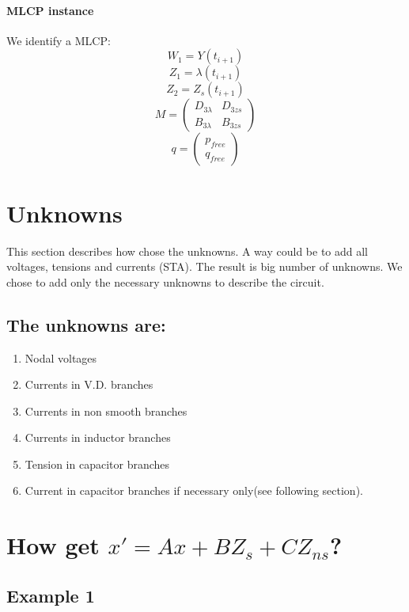 \paragraph{MLCP instance}
We identify a MLCP:\\
\[W_{1} = Y(t_{i+1})\]
\[Z_{1} = \lambda(t_{i+1})\]
\[Z_{2} = Z_{s}(t_{i+1})\]
\[M = \left(\begin{array}{cc}
  D_{3\lambda}&D_{3zs}\\
B_{3\lambda}&B_{3zs}
\end{array}\right)\]
\[q=\left(\begin{array}{c}
p_{free}\\
q_{free}\end{array}\right)\]

\section{Unknowns}
This section describes how chose the unknowns. A way could be to add all voltages, tensions and
currents (STA). The result is big number of unknowns. We chose to add only the necessary unknowns to
describe the circuit.

\subsection{The unknowns are:\\}
\begin{enumerate}
\item Nodal voltages\\
\item Currents in V.D. branches\\
\item Currents in non smooth branches\\
\item Currents in inductor branches\\
\item Tension in capacitor branches\\
\item Current in capacitor branches if necessary only(see following section).\\
\end{enumerate}


\section{How get $x' = Ax+BZ_{s} + CZ_{ns}$?}
\subsection{Example 1}
\begin{figure}[h]
\centerline{
 \scalebox{0.9}{
    
 }
}
\end{figure}
